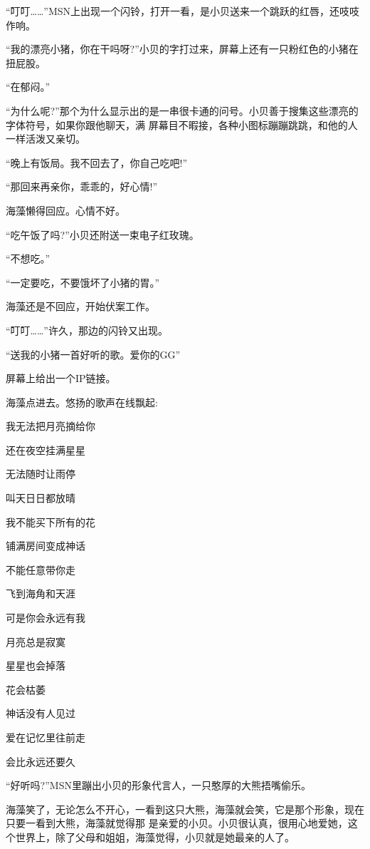 \documentclass[11pt,a4paper,onecolumn]{article}
\begin{document}
``叮叮……''MSN上出现一个闪铃，打开一看，是小贝送来一个跳跃的红唇，还吱吱作响。

``我的漂亮小猪，你在干吗呀?''小贝的字打过来，屏幕上还有一只粉红色的小猪在扭屁股。

``在郁闷。''

``为什么呢?''那个为什么显示出的是一串很卡通的问号。小贝善于搜集这些漂亮的字体符号，如果你跟他聊天，满
屏幕目不暇接，各种小图标蹦蹦跳跳，和他的人一样活泼又亲切。

``晚上有饭局。我不回去了，你自己吃吧!''

``那回来再亲你，乖乖的，好心情!''

海藻懒得回应。心情不好。

``吃午饭了吗?''小贝还附送一束电子红玫瑰。

``不想吃。''

``一定要吃，不要饿坏了小猪的胃。''

海藻还是不回应，开始伏案工作。

``叮叮……''许久，那边的闪铃又出现。

``送我的小猪一首好听的歌。爱你的GG''

屏幕上给出一个IP链接。

海藻点进去。悠扬的歌声在线飘起:

\begin{center} {\sffamily

我无法把月亮摘给你

还在夜空挂满星星

无法随时让雨停

叫天日日都放晴

我不能买下所有的花

铺满房间变成神话

不能任意带你走

飞到海角和天涯

可是你会永远有我

月亮总是寂寞

星星也会掉落

花会枯萎

神话没有人见过

爱在记忆里往前走

会比永远还要久}
\end{center}

``好听吗?''MSN里蹦出小贝的形象代言人，一只憨厚的大熊捂嘴偷乐。

海藻笑了，无论怎么不开心，一看到这只大熊，海藻就会笑，它是那个形象，现在只要一看到大熊，海藻就觉得那
是亲爱的小贝。小贝很认真，很用心地爱她，这个世界上，除了父母和姐姐，海藻觉得，小贝就是她最亲的人了。
\end{document}
